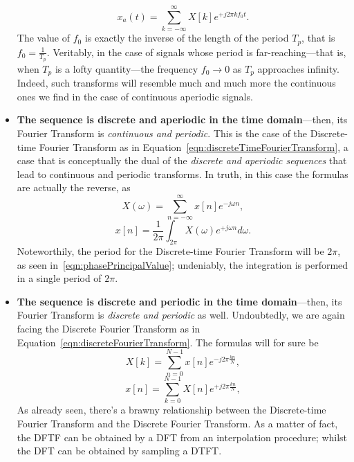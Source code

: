 \documentclass[\documentfontsize, twocolumn]{\classname}
\begin{document}
\begin{itemize}
        \begin{equation}\label{eqn:inverseFourierTransformContinuousPeriodic}
            x_a(t) = \sum_{k=-\infty}^\infty X[k] e^{+j2\pi kf_0t}.
        \end{equation}
        The value of $f_0$ is exactly the inverse of the length of the period $T_p$, that is $f_0 = \frac 1 {T_p}$. Veritably, in the case of signals whose period is far-reaching---that is, when $T_p$ is a lofty quantity---the frequency $f_0 \rightarrow 0$ as $T_p$ approaches infinity. Indeed, such transforms will resemble much and much more the continuous ones we find in the case of continuous aperiodic signals.
    \item \textbf{The sequence is discrete and aperiodic in the time domain}---then, its Fourier Transform is \emph{continuous and periodic}. This is the case of the Discrete-time Fourier Transform as in Equation~\ref{eqn:discreteTimeFourierTransform}, a case that is conceptually the dual of the \emph{discrete and aperiodic sequences} that lead to continuous and periodic transforms. In truth, in this case the formulas are actually the reverse, as
        \begin{equation}\label{eqn:fourierTransformDiscreteAperiodic}
            X(\omega) = \sum_{n=-\infty}^\infty x[n] e^{-j\omega n},
        \end{equation}
        \begin{equation}\label{eqn:inverseFourierTransformDiscreteAperiodic}
            x[n] = \frac{1}{2\pi}\int_{2\pi} X(\omega) e^{+j\omega n} d\omega.
        \end{equation}
        Noteworthily, the period for the Discrete-time Fourier Transform will be $2\pi$, as seen in~\ref{eqn:phasePrincipalValue}; undeniably, the integration is performed in a single period of $2\pi$.
    \item \textbf{The sequence is discrete and periodic in the time domain}---then, its Fourier Transform is \emph{discrete and periodic} as well. Undoubtedly, we are again facing the Discrete Fourier Transform as in Equation~\ref{eqn:discreteFourierTransform}. The formulas will for sure be
        \begin{equation}\label{eqn:fourierTransformDiscretePeriodic}
            X[k] = \sum_{n=0}^{N-1} x[n] e^{-j2\pi \frac{kn}{N}},
        \end{equation}
        \begin{equation}\label{eqn:inverseFourierTransformDiscretePeriodic}
            x[n] = \sum_{k=0}^{N-1} X[n] e^{+j2\pi \frac{kn}{N}},
        \end{equation}
        As already seen, there's a brawny relationship between the Discrete-time Fourier Transform and the Discrete Fourier Transform. As a matter of fact, the DFTF can be obtained by a DFT from an interpolation procedure; whilst the DFT can be obtained by sampling a DTFT.
\end{itemize}
\end{document}
